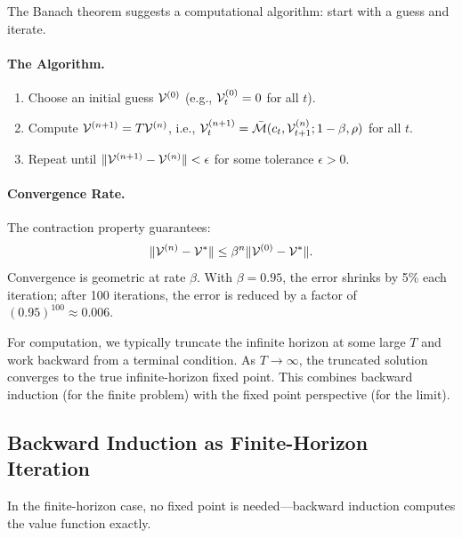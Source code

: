 The Banach theorem suggests a computational algorithm: start with a guess and iterate.

\paragraph{The Algorithm.}
\begin{enumerate}[label=\textbf{Step \arabic*:}, leftmargin=3.5em]
    \item Choose an initial guess $\mathcal{V}^{(0)}$ (e.g., $\mathcal{V}_t^{(0)} = 0$ for all $t$).
    \item Compute $\mathcal{V}^{(n+1)} = T\mathcal{V}^{(n)}$, i.e., $\mathcal{V}_t^{(n+1)} = \bar{\mathcal{M}}(c_t, \mathcal{V}_{t+1}^{(n)}; 1-\beta, \rho)$ for all $t$.
    \item Repeat until $\|\mathcal{V}^{(n+1)} - \mathcal{V}^{(n)}\| < \epsilon$ for some tolerance $\epsilon > 0$.
\end{enumerate}

\paragraph{Convergence Rate.}
The contraction property guarantees:
\begin{equation}
\|\mathcal{V}^{(n)} - \mathcal{V}^*\| \leq \beta^n \|\mathcal{V}^{(0)} - \mathcal{V}^*\|.
\label{eq:convergence-rate}
\end{equation}
Convergence is geometric at rate $\beta$. With $\beta = 0.95$, the error shrinks by 5\% each iteration; after 100 iterations, the error is reduced by a factor of $(0.95)^{100} \approx 0.006$.

\begin{calloutnote}
For computation, we typically truncate the infinite horizon at some large $T$ and work backward from a terminal condition. As $T \to \infty$, the truncated solution converges to the true infinite-horizon fixed point. This combines backward induction (for the finite problem) with the fixed point perspective (for the limit).
\end{calloutnote}

\subsection{Backward Induction as Finite-Horizon Iteration}
\label{subsec:backward-finite}

In the finite-horizon case, no fixed point is needed---backward induction computes the value function exactly.


